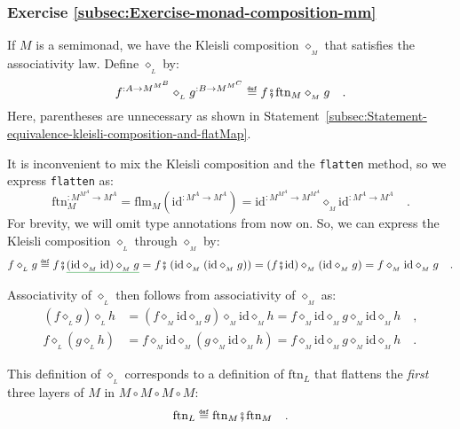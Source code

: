 \subsubsection*{Exercise \ref{subsec:Exercise-monad-composition-mm}}

If $M$ is a semimonad, we have the Kleisli composition $\diamond_{_{M}}$
that satisfies the associativity law. Define $\diamond_{_{L}}$ by:
\[
f^{:A\rightarrow M^{M^{B}}}\diamond_{_{L}}g^{:B\rightarrow M^{M^{C}}}\triangleq f\bef\text{ftn}_{M}\diamond_{_{M}}g\quad.
\]
Here, parentheses are unnecessary as shown in Statement~\ref{subsec:Statement-equivalence-kleisli-composition-and-flatMap}.

It is inconvenient to mix the Kleisli composition and the \lstinline!flatten!
method, so we express \lstinline!flatten! as:
\[
\text{ftn}_{M}^{:M^{M^{A}}\rightarrow M^{A}}=\text{flm}_{M}(\text{id}^{:M^{A}\rightarrow M^{A}})=\text{id}^{:M^{M^{A}}\rightarrow M^{M^{A}}}\diamond_{_{M}}\text{id}^{:M^{A}\rightarrow M^{A}}\quad.
\]
For brevity, we will omit type annotations from now on. So, we can
express the Kleisli composition $\diamond_{_{L}}$ through $\diamond_{_{M}}$
by:
\[
f\diamond_{_{L}}g\triangleq f\bef\gunderline{\left(\text{id}\diamond_{_{M}}\text{id}\right)\diamond_{_{M}}g}=f\bef\left(\text{id}\diamond_{_{M}}\left(\text{id}\diamond_{_{M}}g\right)\right)=\left(f\bef\text{id}\right)\diamond_{_{M}}\left(\text{id}\diamond_{_{M}}g\right)=f\diamond_{_{M}}\text{id}\diamond_{_{M}}g\quad.
\]

Associativity of $\diamond_{_{L}}$ then follows from associativity
of $\diamond_{_{M}}$ as:
\begin{align*}
\left(f\diamond_{_{L}}g\right)\diamond_{_{L}}h & =\left(f\diamond_{_{M}}\text{id}\diamond_{_{M}}g\right)\diamond_{_{M}}\text{id}\diamond_{_{M}}h=f\diamond_{_{M}}\text{id}\diamond_{_{M}}g\diamond_{_{M}}\text{id}\diamond_{_{M}}h\quad,\\
f\diamond_{_{L}}\left(g\diamond_{_{L}}h\right) & =f\diamond_{_{M}}\text{id}\diamond_{_{M}}\left(g\diamond_{_{M}}\text{id}\diamond_{_{M}}h\right)=f\diamond_{_{M}}\text{id}\diamond_{_{M}}g\diamond_{_{M}}\text{id}\diamond_{_{M}}h\quad.
\end{align*}

This definition of $\diamond_{_{L}}$ corresponds to a definition
of $\text{ftn}_{L}$ that flattens the \emph{first} three layers of
$M$ in $M\circ M\circ M\circ M$:
\[
\text{ftn}_{L}\triangleq\text{ftn}_{M}\bef\text{ftn}_{M}\quad.
\]

